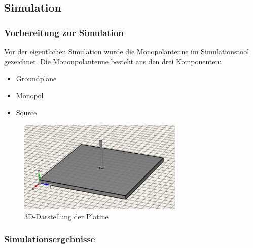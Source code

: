 \vspace{30mm}

\subsection{Simulation}

\subsubsection{Vorbereitung zur Simulation}

Vor der eigentlichen Simulation wurde die Monopolantenne im Simulationstool gezeichnet. Die Mononpolantenne besteht aus den drei Komponenten:
\begin{itemize}
	\item Groundplane
	\item Monopol
	\item Source
\end{itemize}

\begin{figure}[htbp]
	\centering
	\includegraphics[width=0.7\textwidth]{pic/Simulationen/3D.JPG}
	\caption{3D-Darstellung der Platine}
	\label{fig:3Ddarstellung}
\end{figure}

\newpage

\subsubsection{Simulationsergebnisse}


